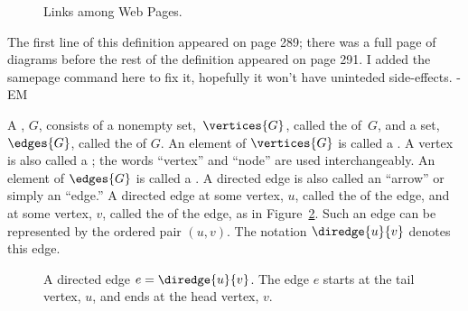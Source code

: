 \iffalse

and in the following graph the vertices $x_1, \ldots, x_n$ correspond
to web pages and $\diredge{x_i}{x_j}$ is a directed edge when page
$x_i$ contains a hyperlink to page $x_j$.
\fi


\begin{figure}


\caption{Links among Web Pages.}

\label{webpage-links}

\end{figure}
\begin{editingnotes}

The first line of this definition appeared on page 289; there was a
full page of diagrams before the rest of the definition appeared on
page 291. I added the samepage command here to fix it, hopefully it
won't have uninteded side-effects. -EM
\end{editingnotes}

\begin{samepage}
\begin{definition}\label{graphdef}
  A , $G$, consists of a nonempty
  set,~$\vertices{G}$, called the  of~$G$, and a set,
  $\edges{G}$, called the  of $G$.  An element of
  $\vertices{G}$ is called a .  A vertex is also called a
  ; the words ``vertex'' and ``node'' are used
  interchangeably.  An element of $\edges{G}$ is called a
  .  A directed edge is also called an ``arrow''
  or simply an ``edge.''  A directed edge  at some vertex, $u$, called the 
  of the edge, and  at some vertex,
  $v$, called the  of the edge, as in Figure~\ref{fig:6EA}.
  Such an edge can be represented by the ordered pair $(u,v)$.  The
  notation $\diredge{u}{v}$ denotes this edge.
\end{definition}
\end{samepage}

\begin{figure}


\caption{A directed edge $e = \diredge{u}{v}$.  The edge $e$ starts at
  the tail vertex, $u$, and ends at the head vertex, $v$.}

\label{fig:6EA}
\end{figure}

